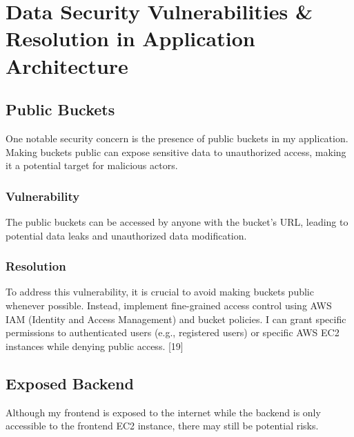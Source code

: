 
\newpage

\clearpage

\chapter{Data Security Vulnerabilities \& Resolution in Application Architecture}

\section{Public Buckets}
One notable security concern is the presence of public buckets in my application. Making buckets public can expose sensitive data to unauthorized access, making it a potential target for malicious actors.

\subsection{Vulnerability}
The public buckets can be accessed by anyone with the bucket's URL, leading to potential data leaks and unauthorized data modification.

\subsection{Resolution} To address this vulnerability, it is crucial to avoid making buckets public whenever possible. Instead, implement fine-grained access control using AWS IAM (Identity and Access Management) and bucket policies. I can grant specific permissions to authenticated users (e.g., registered users) or specific AWS EC2 instances while denying public access. [19]

\section{Exposed Backend}
Although my frontend is exposed to the internet while the backend is only accessible to the frontend EC2 instance, there may still be potential risks.

